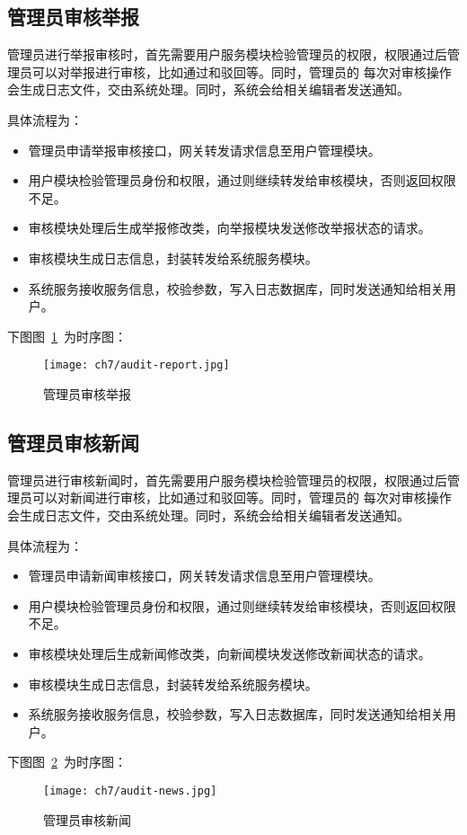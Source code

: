 \subsection{管理员审核举报}
管理员进行举报审核时，首先需要用户服务模块检验管理员的权限，权限通过后管理员可以对举报进行审核，比如通过和驳回等。同时，管理员的
每次对审核操作会生成日志文件，交由系统处理。同时，系统会给相关编辑者发送通知。

具体流程为：
\begin{itemize}
    \item 管理员申请举报审核接口，网关转发请求信息至用户管理模块。
    \item 用户模块检验管理员身份和权限，通过则继续转发给审核模块，否则返回权限不足。
    \item 审核模块处理后生成举报修改类，向举报模块发送修改举报状态的请求。
    \item 审核模块生成日志信息，封装转发给系统服务模块。
    \item 系统服务接收服务信息，校验参数，写入日志数据库，同时发送通知给相关用户。
\end{itemize}

下图图~\ref{fig:audit-report}~为时序图：
\begin{figure}[htbp]
    \centering
    \texttt{[image: ch7/audit-report.jpg]}
    \caption{管理员审核举报}\label{fig:audit-report}
    \vspace{\baselineskip} %
\end{figure}

\subsection{管理员审核新闻}
管理员进行审核新闻时，首先需要用户服务模块检验管理员的权限，权限通过后管理员可以对新闻进行审核，比如通过和驳回等。同时，管理员的
每次对审核操作会生成日志文件，交由系统处理。同时，系统会给相关编辑者发送通知。

具体流程为：
\begin{itemize}
    \item 管理员申请新闻审核接口，网关转发请求信息至用户管理模块。
    \item 用户模块检验管理员身份和权限，通过则继续转发给审核模块，否则返回权限不足。
    \item 审核模块处理后生成新闻修改类，向新闻模块发送修改新闻状态的请求。
    \item 审核模块生成日志信息，封装转发给系统服务模块。
    \item 系统服务接收服务信息，校验参数，写入日志数据库，同时发送通知给相关用户。
\end{itemize}

下图图~\ref{fig:audit-news}~为时序图：
\begin{figure}[htbp]
    \centering
    \texttt{[image: ch7/audit-news.jpg]}
    \caption{管理员审核新闻}\label{fig:audit-news}
    \vspace{\baselineskip} %
\end{figure}







